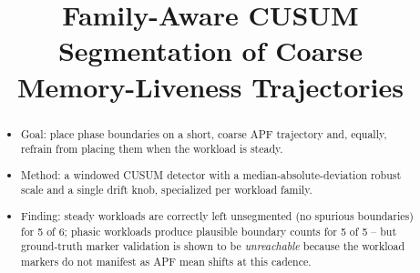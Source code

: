 \documentclass[conference]{IEEEtran}
\title{Family-Aware CUSUM Segmentation of Coarse\\
Memory-Liveness Trajectories}
\author{\IEEEauthorblockN{TODO Author list}
\IEEEauthorblockA{TODO Affiliation}}
\begin{document}
\maketitle

\begin{abstract}
\begin{itemize}
  \item Goal: place phase boundaries on a short, coarse APF trajectory and,
        equally, refrain from placing them when the workload is steady.
  \item Method: a windowed CUSUM detector with a median-absolute-deviation
        robust scale and a single drift knob, specialized per workload family.
  \item Finding: steady workloads are correctly left unsegmented (no spurious
        boundaries) for 5 of 6; phasic workloads produce plausible boundary
        counts for 5 of 5 -- but ground-truth marker validation is shown to be
        \emph{unreachable} because the workload markers do not manifest as APF
        mean shifts at this cadence.
\end{itemize}
\end{abstract}
\end{document}
